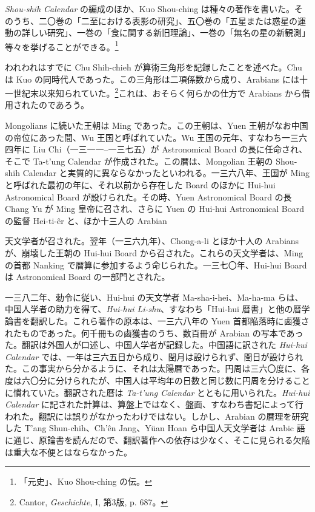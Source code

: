 \documentclass[11pt]{article}
\newcommand{\scanpage}[2]{\clearpage\setcounter{footnote}{0}\noindent{\footnotesize\color{gray}PDF #1 頁 · #2}\par\medskip}
\newcommand{\scanfooter}{}
\begin{document}
\emph{Shou-shih Calendar} の編成のほか、Kuo Shou-ching は種々の著作を書いた。そのうち、二〇巻の「二至における表影の研究」、五〇巻の「五星または惑星の運動の詳しい研究」、一巻の「食に関する新旧理論」、一巻の「無名の星の新観測」等々を挙げることができる。\footnote{「元史」、Kuo Shou-ching の伝。}

われわれはすでに Chu Shih-chieh が算術三角形を記録したことを述べた。Chu は Kuo の同時代人であった。この三角形は二項係数から成り、Arabians には十一世紀末以来知られていた。\footnote{Cantor, \emph{Geschichte}, I, 第3版, p. 687。}これは、おそらく何らかの仕方で Arabians から借用されたのであろう。

Mongolians に続いた王朝は Ming であった。この王朝は、Yuen 王朝がなお中国の帝位にあった間、Wu 王国と呼ばれていた。Wu 王国の元年、すなわち一三六四年に Liu Chi（一三一一--一三七五）が Astronomical Board の長に任命され、そこで Ta-t'ung Calendar が作成された。この暦は、Mongolian 王朝の Shou-shih Calendar と実質的に異ならなかったといわれる。一三六八年、王国が Ming と呼ばれた最初の年に、それ以前から存在した Board のほかに Hui-hui Astronomical Board が設けられた。その時、Yuen Astronomical Board の長 Chang Yu が Ming 皇帝に召され、さらに Yuen の Hui-hui Astronomical Board の監督 Hei-ti-êr と、ほか十三人の Arabian
\scanfooter

\scanpage{0121}{第15章、印刷頁107}
\setcounter{footnote}{0}
天文学者が召された。翌年（一三六九年）、Chong-a-li とほか十人の Arabians が、崩壊した王朝の Hui-hui Board から召された。これらの天文学者は、Ming の首都 Nanking で暦算に参加するよう命じられた。一三七〇年、Hui-hui Board は Astronomical Board の一部門とされた。

一三八二年、勅令に従い、Hui-hui の天文学者 Ma-sha-i-hei、Ma-ha-ma らは、中国人学者の助力を得て、\emph{Hui-hui Li-shu}、すなわち「Hui-hui 暦書」と他の暦学論書を翻訳した。これら著作の原本は、一三六八年の Yuen 首都陥落時に鹵獲されたものであった。何千冊もの鹵獲書のうち、数百冊が Arabian の写本であった。翻訳は外国人が口述し、中国人学者が記録した。中国語に訳された \emph{Hui-hui Calendar} では、一年は三六五日から成り、閏月は設けられず、閏日が設けられた。この事実から分かるように、それは太陽暦であった。円周は三六〇度に、各度は六〇分に分けられたが、中国人は平均年の日数と同じ数に円周を分けることに慣れていた。翻訳された暦は \emph{Ta-t'ung Calendar} とともに用いられた。\emph{Hui-hui Calendar} に記された計算は、算盤上ではなく、盤面、すなわち書記によって行われた。翻訳には誤りがなかったわけではない。しかし、Arabian の暦理を研究した T'ang Shun-chih、Ch'ên Jang、Yüan Hoan ら中国人天文学者は Arabic 語に通じ、原論書を読んだので、翻訳著作への依存は少なく、そこに見られる欠陥は重大な不便とはならなかった。
\end{document}
